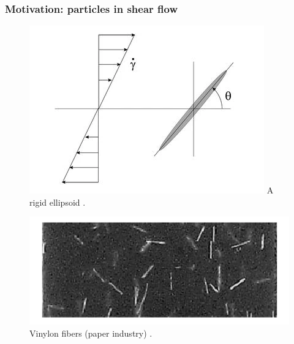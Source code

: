 \documentclass{beamer}
\begin{document}
\begin{frame}
	\frametitle{Motivation: particles in shear flow}
	\begin{overlayarea}{\textwidth}{\textheight}
		\vspace{-0.2cm}
    	\begin{figure}
			\begin{minipage}{0.4\linewidth}
				\centering
				\includegraphics[width=\linewidth]{plots/application2.png} 
			 \centering \scriptsize A rigid ellipsoid \cite{yasuda2004experimental}.
			\end{minipage}
		\begin{minipage}{0.5\linewidth}
			\centering
			\includegraphics[width=\linewidth]{plots/application2_2.png} 
			\centering \scriptsize Vinylon fibers (paper industry) \cite{yasuda2004experimental}.
		\end{minipage}\vspace{0.5cm}
	\begin{minipage}{0.3\linewidth}
		\centering

\end{minipage}
\end{figure}
\end{overlayarea}
\end{frame}
\end{document}

